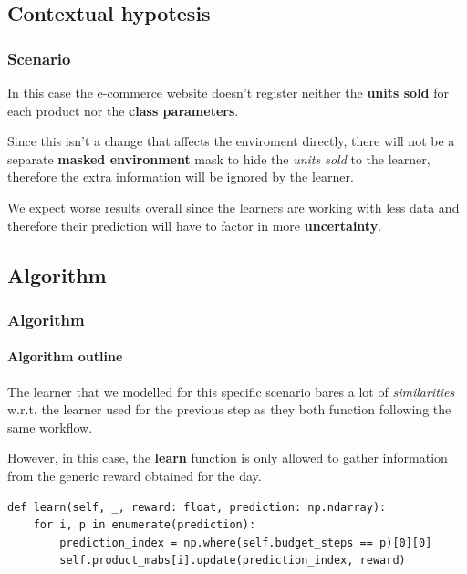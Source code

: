 
\subsection{Contextual hypotesis}


\begin{frame}

\frametitle{Scenario}

In this case the e-commerce website doesn't register neither the \textbf{units sold} for each product nor the \textbf{class parameters}.

Since this isn't a change that affects the enviroment directly, there will not be a separate \textbf{masked environment} mask to hide the \textit{units sold} to the learner, therefore the extra information will be ignored by the learner.

We expect worse results overall since the learners are working with less data and therefore their prediction will have to factor in more \textbf{uncertainty}.

\end{frame}


\subsection{Algorithm}


\begin{frame}[fragile]

\frametitle{Algorithm}
\framesubtitle{Algorithm outline}

The learner that we modelled for this specific scenario bares a lot of \textit{similarities} w.r.t. the learner used for the previous step as they both function following the same workflow.

However, in this case, the \textbf{learn} function is only allowed to gather information from the generic reward obtained for the day.

\vspace*{1em}

\begin{lstlisting}[style=Python, basicstyle=\tiny, numbers=none]
def learn(self, _, reward: float, prediction: np.ndarray):
	for i, p in enumerate(prediction):
		prediction_index = np.where(self.budget_steps == p)[0][0]
		self.product_mabs[i].update(prediction_index, reward)
\end{lstlisting}

\end{frame}

